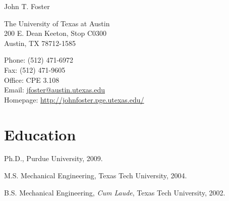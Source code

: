 \documentclass[12pt,letterpaper]{article}
\makeatletter
\let\saved@bibitem\@bibitem %
\def\HCode#1{}
\def\name{John T. Foster}
\renewenvironment{itemize}{
  \begin{list}{}{
    \setlength{\leftmargin}{1.5em}
    \setlength{\itemsep}{0.25em}
    \setlength{\parskip}{0pt}
    \setlength{\parsep}{0.25em}
  }
}{
  \end{list}
}
\makeatother
\begin{document}
\sloppy

\begingroup
\makeatletter
\let\@bibitem\saved@bibitem %
\endgroup

\HCode{<div class="fluid-container"}

\HCode{<div class="row">}
\HCode{<div class="col-md-12">}
\HCode{<h1>}
{\huge \name}
\HCode{</h1>}
\HCode{</div>} %
\HCode{</div>} %

\bigskip

\HCode{<div class="row">}
\HCode{<div class="col-md-4">}
\begin{minipage}[t]{0.5\textwidth}
  The University of Texas at Austin \\
  200 E. Dean Keeton, Stop C0300 \\
  Austin, TX 78712-1585 \\
\end{minipage}
\HCode{</div>} %
\HCode{<div class="col-md-8">}
\begin{minipage}[t]{0.5\textwidth}
  Phone: (512) 471-6972 \\
  Fax: (512) 471-9605 \\
  Office: CPE 3.108 \\
\ifdefined\ispdf
  Email: \href{mailto:jfoster@austin.utexas.edu}{jfoster@austin.utexas.edu} \\
\fi
  Homepage: \href{http://johnfoster.pge.utexas.edu/}{http://johnfoster.pge.utexas.edu/}
\end{minipage}
\HCode{</div>} %
\HCode{</div>} %

\HCode{<div class="row">}
\HCode{<div class="col-md-12">}
\section*{Education}

\begin{itemize}
    \item Ph.D., Purdue University, 2009.
    \item M.S. Mechanical Engineering, Texas Tech University, 2004.
    \item B.S. Mechanical Engineering, \textit{Cum Laude},
    Texas Tech University, 2002.
\end{itemize}
\end{document}
